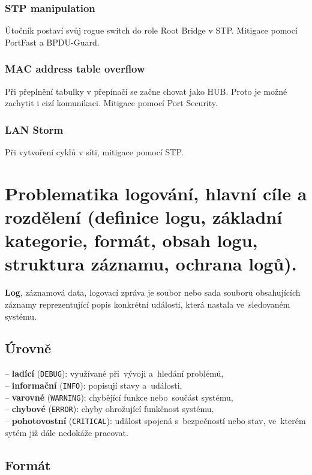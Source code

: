 \subsubsection{STP manipulation}
Útočník postaví svůj rogue switch do role Root Bridge v STP. Mitigace pomocí PortFast a BPDU-Guard.

\subsubsection{MAC address table overflow}
Při přeplnění tabulky v přepínači se začne chovat jako HUB. Proto je možné zachytit i cizí komunikaci. Mitigace pomocí Port Security.

\subsubsection{LAN Storm}
Při vytvoření cyklů v síti, mitigace pomocí STP.

\clearpage
\section{Problematika logování, hlavní cíle a rozdělení (definice logu, základní kategorie, formát, obsah logu, struktura záznamu, ochrana logů).}

\textbf{Log}, záznamová data, logovací zpráva je soubor nebo sada souborů obsahujících záznamy reprezentující popis konkrétní události, která nastala ve~sledovaném systému.

\subsection{Úrovně}

-- \textbf{ladící} (\texttt{DEBUG}): využívané při~vývoji a~hledání problémů, \\
-- \textbf{informační} (\texttt{INFO}): popisují stavy a~události, \\
-- \textbf{varovné} (\texttt{WARNING}): chybějící funkce nebo~součást systému, \\
-- \textbf{chybové} (\texttt{ERROR}): chyby ohrožující funkčnost systému, \\
-- \textbf{pohotovostní} (\texttt{CRITICAL}): událost spojená s~bezpečností nebo stav, ve~kterém sytém již dále nedokáže pracovat.

\subsection{Formát}


